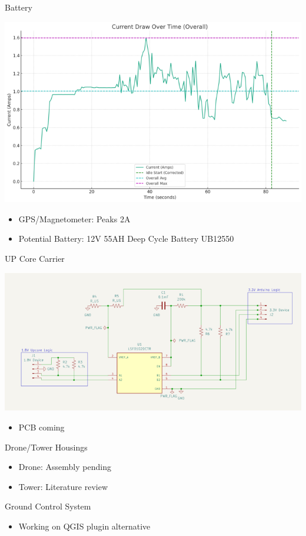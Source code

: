 \begin{frame}{Battery}
    \begin{center}
        \includegraphics[scale=.35]{images/rtt_images/bd3866b0-51eb-47d6-bb89-32361f4ac01a_720.png}
    \end{center}
    \begin{itemize}
        \item GPS/Magnetometer: Peaks 2A
        \item Potential Battery: 12V 55AH Deep Cycle Battery UB12550
    \end{itemize}
\end{frame}
\begin{frame}{UP Core Carrier}
    \begin{center}
        \includegraphics[scale=.35]{images/rtt_images/screenshot_2024-02-14_at_1.13.25___pm_720.png}
    \end{center}
    \begin{itemize}
        \item PCB coming
    \end{itemize}
\end{frame}
\begin{frame}{Drone/Tower Housings}
    \begin{itemize}
        \item Drone: Assembly pending
        \item Tower: Literature review
    \end{itemize}
\end{frame}
\begin{frame}{Ground Control System}
    \begin{itemize}
        \item Working on QGIS plugin alternative
    \end{itemize}
\end{frame}